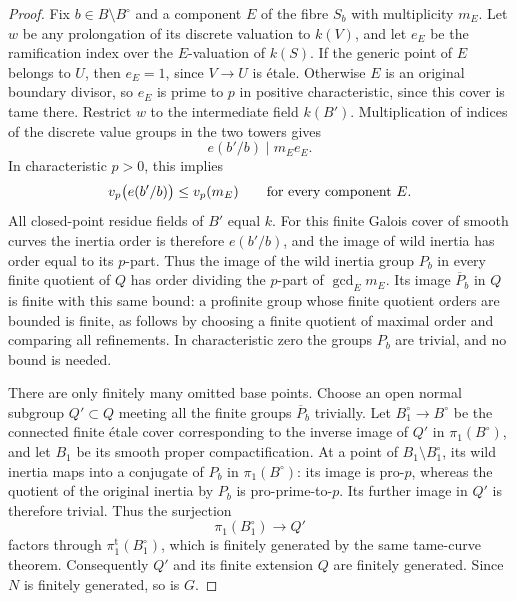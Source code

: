 \begin{proof}
Fix $b\in B\setminus B^\circ$ and a component $E$ of the
fibre $S_b$ with multiplicity $m_E$.  Let $w$ be any
prolongation of its discrete valuation to $k(V)$, and let
$e_E$ be the ramification index over the $E$-valuation of
$k(S)$.  If the generic point of $E$ belongs to $U$, then
$e_E=1$, since $V\to U$ is \'etale.  Otherwise $E$ is an
original boundary divisor, so $e_E$ is prime to $p$ in positive
characteristic, since this cover is tame there.  Restrict $w$
to the intermediate field $k(B')$.  Multiplication of indices
of the discrete value groups in the two towers gives
\[
                  e(b'/b)\mid m_E e_E.
\]
In characteristic $p>0$, this implies
\[
                v_p\bigl(e(b'/b)\bigr)\leq v_p(m_E)
                \qquad\hbox{for every component }E.
\]
All closed-point residue fields of $B'$ equal $k$.  For this
finite Galois cover of smooth curves the inertia order is
therefore $e(b'/b)$, and the image of wild inertia has order
equal to its $p$-part.  Thus the image of the wild inertia
group $P_b$ in every finite quotient of $Q$ has order dividing
the $p$-part of $\gcd_E m_E$.  Its image $\overline P_b$ in
$Q$ is finite with this same bound: a profinite group whose
finite quotient orders are bounded is finite, as follows by
choosing a finite quotient of maximal order and comparing
all refinements.  In characteristic zero the groups $P_b$
are trivial, and no bound is needed.

There are only finitely many omitted base points.  Choose an
open normal subgroup $Q'\subset Q$ meeting all the finite
groups $\overline P_b$ trivially.  Let
$B_1^\circ\to B^\circ$ be the connected finite \'etale cover
corresponding to the inverse image of $Q'$ in $\pi_1(B^\circ)$,
and let $B_1$ be its smooth proper compactification.
At a point of $B_1\setminus B_1^\circ$, its wild inertia maps
into a conjugate of $P_b$ in $\pi_1(B^\circ)$: its image is
pro-$p$, whereas the quotient of the original inertia by
$P_b$ is pro-prime-to-$p$.  Its further image in $Q'$ is
therefore trivial.  Thus the surjection
\[
                    \pi_1(B_1^\circ)\longrightarrow Q'
\]
factors through $\pi_1^{\mathrm t}(B_1^\circ)$, which is
finitely generated by the same tame-curve theorem.
Consequently $Q'$ and its finite extension $Q$ are finitely
generated.  Since $N$ is finitely generated, so is $G$.
\end{proof}

